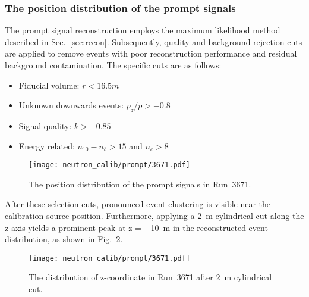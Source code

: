 \subsubsection{The position distribution of the prompt signals}
The prompt signal reconstruction employs the maximum likelihood method described in Sec.~\ref{sec:recon}.
Subsequently, quality and background rejection cuts are applied to remove events with poor reconstruction performance and residual background contamination. The specific cuts are as follows:
\begin{itemize}
	\item Fiducial volume: $r<16.5\si{m}$
	\item Unknown downwards events: $p_z/p>-0.8$
	\item Signal quality: $k>-0.85$
	\item Energy related: $n_{10}-n_{b}>15$ and $n_c>8$
\end{itemize}

\begin{figure}[htbp]
	\centering
	\texttt{[image: neutron\_calib/prompt/3671.pdf]}
	\caption{The position distribution of the prompt signals in Run~3671.}
	\label{fig:positionPrompt}
\end{figure}
After these selection cuts, pronounced event clustering is visible near the calibration source position.
Furthermore, applying a \SI{2}{m} cylindrical cut along the z-axis yields a prominent peak at z = \SI{-10}{m} in the reconstructed event distribution, as shown in Fig.~\ref{fig:positionPrompt_z}.
\begin{figure}[htbp]
	\centering
	\texttt{[image: neutron\_calib/prompt/3671.pdf]}
	\caption{The distribution of z-coordinate in Run~3671 after \SI{2}{m} cylindrical cut.}
	\label{fig:positionPrompt_z}
\end{figure}

